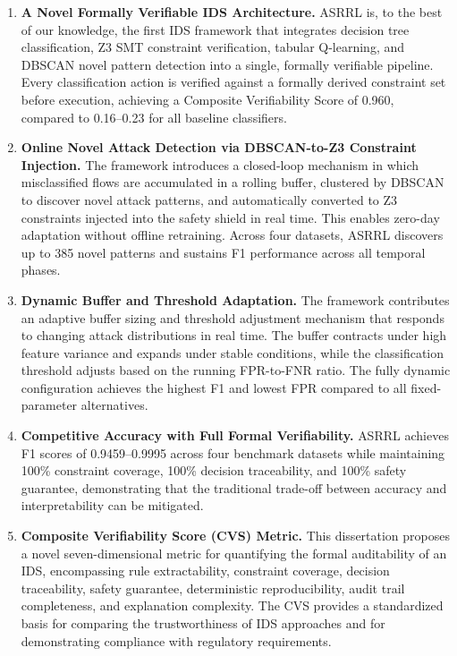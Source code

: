 \documentclass[12pt, letterpaper, oneside]{report}
\newcommand{\ASRRL}{\textsc{ASRRL}}
\begin{document}
\begin{enumerate}
    \item \textbf{A Novel Formally Verifiable IDS Architecture.} \ASRRL{} is, to the best of our knowledge, the first IDS framework that integrates decision tree classification, Z3 SMT constraint verification, tabular Q-learning, and DBSCAN novel pattern detection into a single, formally verifiable pipeline. Every classification action is verified against a formally derived constraint set before execution, achieving a Composite Verifiability Score of 0.960, compared to 0.16--0.23 for all baseline classifiers.

    \item \textbf{Online Novel Attack Detection via DBSCAN-to-Z3 Constraint Injection.} The framework introduces a closed-loop mechanism in which misclassified flows are accumulated in a rolling buffer, clustered by DBSCAN to discover novel attack patterns, and automatically converted to Z3 constraints injected into the safety shield in real time. This enables zero-day adaptation without offline retraining. Across four datasets, \ASRRL{} discovers up to 385 novel patterns and sustains F1 performance across all temporal phases.

    \item \textbf{Dynamic Buffer and Threshold Adaptation.} The framework contributes an adaptive buffer sizing and threshold adjustment mechanism that responds to changing attack distributions in real time. The buffer contracts under high feature variance and expands under stable conditions, while the classification threshold adjusts based on the running FPR-to-FNR ratio. The fully dynamic configuration achieves the highest F1 and lowest FPR compared to all fixed-parameter alternatives.

    \item \textbf{Competitive Accuracy with Full Formal Verifiability.} \ASRRL{} achieves F1 scores of 0.9459--0.9995 across four benchmark datasets while maintaining 100\% constraint coverage, 100\% decision traceability, and 100\% safety guarantee, demonstrating that the traditional trade-off between accuracy and interpretability can be mitigated.

    \item \textbf{Composite Verifiability Score (CVS) Metric.} This dissertation proposes a novel seven-dimensional metric for quantifying the formal auditability of an IDS, encompassing rule extractability, constraint coverage, decision traceability, safety guarantee, deterministic reproducibility, audit trail completeness, and explanation complexity. The CVS provides a standardized basis for comparing the trustworthiness of IDS approaches and for demonstrating compliance with regulatory requirements.
\end{enumerate}
\end{document}
